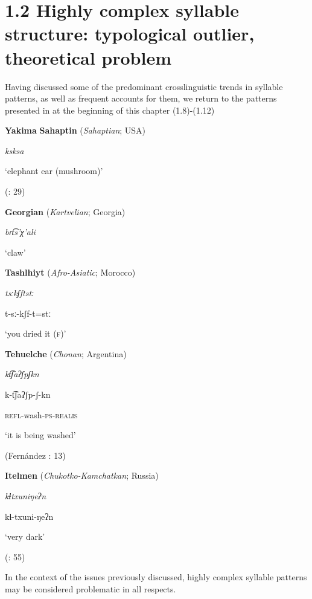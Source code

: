 \section{1.2 Highly complex syllable structure: typological outlier, theoretical problem}

  Having discussed some of the predominant crosslinguistic trends in syllable patterns, as well as frequent accounts for them, we return to the patterns presented in at the beginning of this chapter (1.8)-(1.12)

\ea\label{ex:(1.8)}
   \textbf{Yakima} \textbf{Sahaptin} (\textit{Sahaptian}; USA)

\textit{ksksa}

‘elephant ear (mushroom)’

(\citealt{HargusBeavert2006}: 29)
\z

\ea\label{ex:(1.9)}
   \textbf{Georgian} (\textit{Kartvelian}; Georgia)

\textit{bɾt͡s’χ’ali}

‘claw’

\citep[204]{Butskhrikidze2002}
\z

\ea\label{ex:(1.10)}
   \textbf{Tashlhiyt} (\textit{Afro-Asiatic}; Morocco)

\textit{tsːkʃftstː}

t{}-sː{}-kʃf{}-t=stː

‘you dried it (\textsc{f})’

\citep[332]{Ridouane2008}

\z

\ea\label{ex:(1.11)}
   \textbf{Tehuelche} (\textit{Chonan}; Argentina)

\textit{kt͡ʃaʔʃpʃkn}

k{}-t͡ʃaʔʃp{}-ʃ{}-kn

\textsc{refl}{}-wash-\textsc{ps-realis}

‘it is being washed’

(Fernández \citealt{GarayHernández2006}: 13)
\z

\ea\label{ex:(1.12)}
   \textbf{Itelmen} (\textit{Chukotko-Kamchatkan}; Russia)

\textit{kɬtxuniŋeʔn}

kɬ{}-txuni{}-ŋeʔn

‘very dark’

(\citealt{GeorgVolodin1999}: 55)

\z

In the context of the issues previously discussed, highly complex syllable patterns may be considered problematic in all respects.

